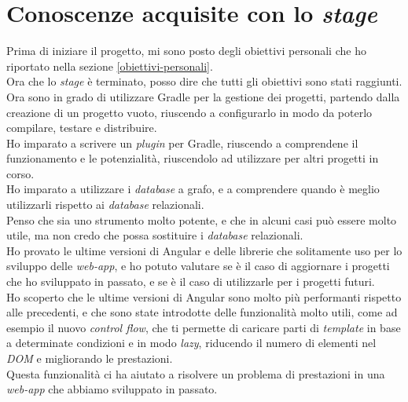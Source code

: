 \section{Conoscenze acquisite con lo \textit{stage}}
Prima di iniziare il progetto, mi sono posto degli obiettivi personali che ho riportato nella sezione \ref{obiettivi-personali}.\\
Ora che lo \textit{stage} è terminato, posso dire che tutti gli obiettivi sono stati raggiunti.\\
Ora sono in grado di utilizzare Gradle per la gestione dei progetti, partendo dalla creazione di un progetto vuoto,
riuscendo a configurarlo in modo da poterlo compilare, testare e distribuire.\\
Ho imparato a scrivere un \textit{plugin} per Gradle, riuscendo a comprendene il funzionamento e le potenzialità, riuscendolo 
ad utilizzare per altri progetti in corso.\\
Ho imparato a utilizzare i \textit{database} a grafo, e a comprendere quando è meglio utilizzarli rispetto ai \textit{database} relazionali.\\
Penso che sia uno strumento molto potente, e che in alcuni casi può essere molto utile, ma non credo che possa sostituire i \textit{database} relazionali.\\
Ho provato le ultime versioni di Angular e delle librerie che solitamente uso per lo sviluppo delle \textit{web-app}, 
e ho potuto valutare se è il caso di aggiornare i progetti che ho sviluppato in passato, e se è il caso di utilizzarle per i progetti futuri.\\
Ho scoperto che le ultime versioni di Angular sono molto più performanti rispetto alle precedenti, e che sono state introdotte delle funzionalità
molto utili, come ad esempio il nuovo \textit{control flow}, che ti permette di caricare parti di \textit{template} in base a determinate condizioni e in 
modo \textit{lazy}, riducendo il numero di elementi nel \textit{DOM} e migliorando le prestazioni.\\
Questa funzionalità ci ha aiutato a risolvere un problema di prestazioni in una \textit{web-app} che abbiamo sviluppato in passato.\\